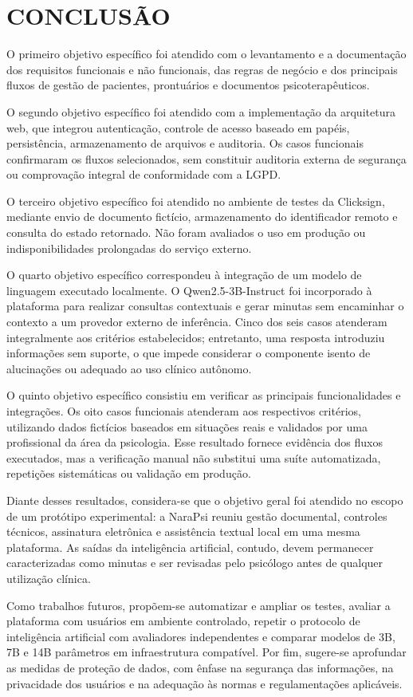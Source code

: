 \chapter{CONCLUSÃO}

O primeiro objetivo específico foi atendido com o levantamento e a documentação dos requisitos funcionais e não funcionais, das regras de negócio e dos principais fluxos de gestão de pacientes, prontuários e documentos psicoterapêuticos.

O segundo objetivo específico foi atendido com a implementação da arquitetura web, que integrou autenticação, controle de acesso baseado em papéis, persistência, armazenamento de arquivos e auditoria. Os casos funcionais confirmaram os fluxos selecionados, sem constituir auditoria externa de segurança ou comprovação integral de conformidade com a LGPD.

O terceiro objetivo específico foi atendido no ambiente de testes da Clicksign, mediante envio de documento fictício, armazenamento do identificador remoto e consulta do estado retornado. Não foram avaliados o uso em produção ou indisponibilidades prolongadas do serviço externo.

O quarto objetivo específico correspondeu à integração de um modelo de linguagem executado localmente. O Qwen2.5-3B-Instruct foi incorporado à plataforma para realizar consultas contextuais e gerar minutas sem encaminhar o contexto a um provedor externo de inferência. Cinco dos seis casos atenderam integralmente aos critérios estabelecidos; entretanto, uma resposta introduziu informações sem suporte, o que impede considerar o componente isento de alucinações ou adequado ao uso clínico autônomo.

O quinto objetivo específico consistiu em verificar as principais funcionalidades e integrações. Os oito casos funcionais atenderam aos respectivos critérios, utilizando dados fictícios baseados em situações reais e validados por uma profissional da área da psicologia. Esse resultado fornece evidência dos fluxos executados, mas a verificação manual não substitui uma suíte automatizada, repetições sistemáticas ou validação em produção.

Diante desses resultados, considera-se que o objetivo geral foi atendido no escopo de um protótipo experimental: a NaraPsi reuniu gestão documental, controles técnicos, assinatura eletrônica e assistência textual local em uma mesma plataforma. As saídas da inteligência artificial, contudo, devem permanecer caracterizadas como minutas e ser revisadas pelo psicólogo antes de qualquer utilização clínica.

Como trabalhos futuros, propõem-se automatizar e ampliar os testes, avaliar a plataforma com usuários em ambiente controlado, repetir o protocolo de inteligência artificial com avaliadores independentes e comparar modelos de 3B, 7B e 14B parâmetros em infraestrutura compatível. Por fim, sugere-se aprofundar as medidas de proteção de dados, com ênfase na segurança das informações, na privacidade dos usuários e na adequação às normas e regulamentações aplicáveis.
